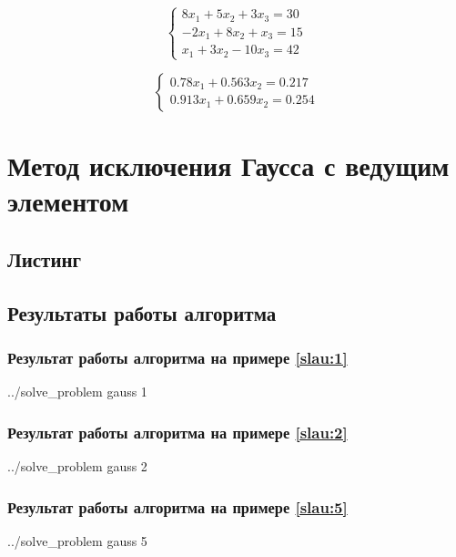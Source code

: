 \documentclass[a4paper]{article}
\begin{document}
\begin{equation}
    \begin{cases}
         8 x_1 + 5 x_2  + 3  x_3 = 30 \\
        -2 x_1 + 8 x_2  +    x_3 = 15 \\
           x_1 + 3 x_2  - 10 x_3 = 42
    \end{cases} \label{slau:4}
\end{equation}

\begin{equation}
    \begin{cases}
        0.78  x_1 + 0.563 x_2 = 0.217 \\
        0.913 x_1 + 0.659 x_2 = 0.254
    \end{cases} \label{slau:5}
\end{equation}

\break

\section{Метод исключения Гаусса с ведущим элементом}

\subsection{Листинг}


\subsection{Результаты работы алгоритма}

\subsubsection{Результат работы алгоритма на примере \eqref{slau:1}}
\bash[stdout]
../solve_problem gauss 1
\END

\subsubsection{Результат работы алгоритма на примере \eqref{slau:2}}
\bash[stdout]
../solve_problem gauss 2
\END

\subsubsection{Результат работы алгоритма на примере \eqref{slau:5}}
\bash[stdout]
../solve_problem gauss 5
\END
\end{document}
